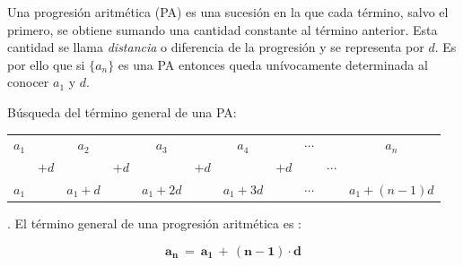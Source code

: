 \begin{definition}

Una progresión aritmética (PA) es una sucesión en la que cada término, salvo el primero, se obtiene sumando una cantidad constante al término anterior. Esta cantidad se llama \emph{distancia} o  diferencia de la progresión y se representa por $d$. Es por ello que si $\{a_n\}$ es una PA entonces queda unívocamente determinada al conocer $a_1$ y $d$.
\end{definition}


\vspace{4mm} Búsqueda del término general de una PA:
\begin{table}[H]
\centering
\begin{tabular}{ccccccccccc}
$a_1$ &  & $a_2$ &  & $a_3$ &  & $a_4$ & &$\cdots$ &  & $a_n$ \\
 & $+d$ &  & $+d$ &  & $+d$ & & $+d$ &  & $\cdots$ &   \\
$a_1$ &  & $a_1+d$ &  & $a_1+2d$ &  & $a_1+3d$ &  &$\cdots$ & & $a_1+(n-1)d$
\end{tabular}
\end{table}

\begin{definition}
. El término general de una progresión aritmética es :

$$\boxed{ \ 	\boldsymbol{ a_n  \ =  \  a_1 \, + \,   ( n - 1 )  \cdot  d } \ }$$
\end{definition}




